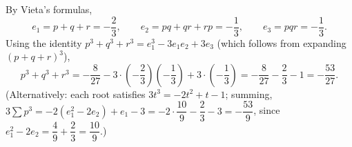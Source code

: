 By Vieta's formulas,
\[e_1=p+q+r=-\dfrac23,\qquad e_2=pq+qr+rp=-\dfrac13,\qquad e_3=pqr=-\dfrac13.\]
Using the identity $p^3+q^3+r^3=e_1^3-3e_1e_2+3e_3$ (which follows from expanding $(p+q+r)^3$),
\[p^3+q^3+r^3=-\dfrac{8}{27}-3\cdot\left(-\dfrac23\right)\left(-\dfrac13\right)+3\cdot\left(-\dfrac13\right)=-\dfrac{8}{27}-\dfrac23-1=\boxed{-\dfrac{53}{27}}.\]
(Alternatively: each root satisfies $3t^3=-2t^2+t-1$; summing, $3\sum p^3=-2\left(e_1^2-2e_2\right)+e_1-3=-2\cdot\dfrac{10}{9}-\dfrac23-3=-\dfrac{53}{9}$, since $e_1^2-2e_2=\dfrac49+\dfrac23=\dfrac{10}{9}$.)
